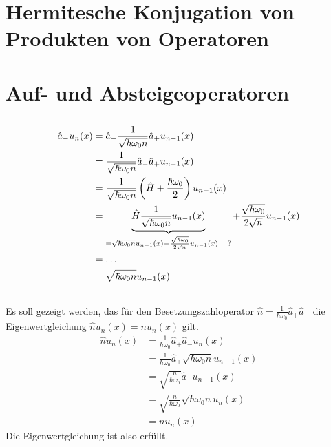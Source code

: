 \section{Hermitesche Konjugation von Produkten von Operatoren}

\section{Auf- und Absteigeoperatoren}

\subsection{}

\begin{align*}
 \hat a_- u_n(x) &= \hat a_- \frac1{\sqrt{\hbar \omega_0 n}} \hat a_+ u_{n-1}(x)\\
 &= \frac1{\sqrt{\hbar \omega_0 n}} \hat a_-\hat a_+ u_{n-1}(x)\\
 &= \frac1{\sqrt{\hbar \omega_0 n}} \del{\hat H + \frac{\hbar \omega_0}{2}} u_{n-1}(x)\\
 &= \underbrace{\hat H \frac1{\sqrt{\hbar \omega_0 n}} u_{n-1}(x)}_{= \sqrt{\hbar\omega_0 n} u_{n-1}(x) - \frac{\sqrt{\hbar \omega_0}}{2\sqrt{n}}u_{n-1}(x) \quad?} 
 + \frac{\sqrt{\hbar \omega_0}}{2 \sqrt{n}} u_{n-1}(x)\\
 &= \ldots\\
 &= \sqrt{\hbar \omega_0 n} u_{n-1}(x)
\end{align*}


\subsection{}

Es soll gezeigt werden, das für den Besetzungszahloperator $\hat n =
\frac1{\hbar\omega_0}\hat a_+\hat a_-$ die Eigenwertgleichung $\hat nu_n(x) =
nu_n(x)$ gilt.
\begin{align*}
    \hat n u_n(x) &= \frac1{\hbar\omega_0}\hat a_+\hat a_- u_n(x) \\
                  &= \frac1{\hbar\omega_0}\hat a_+ \sqrt{\hbar\omega_0n}u_{n-1}(x) \\
                  &= \sqrt{\frac{n}{\hbar\omega_0}} \hat a_+ u_{n-1}(x) \\
                  &= \sqrt{\frac{n}{\hbar\omega_0}} \sqrt{\hbar\omega_0n}u_n(x) \\
                  &= nu_n(x)
\end{align*}
Die Eigenwertgleichung ist also erfüllt.


